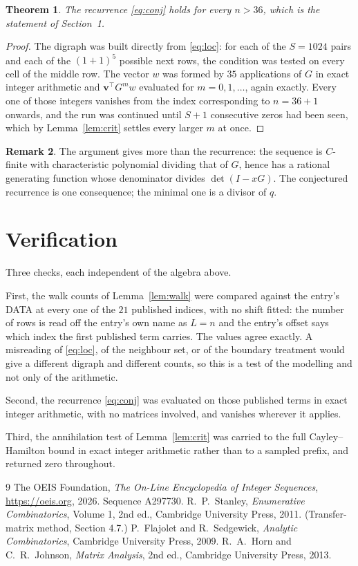 \documentclass[11pt,a4paper]{article}
\theoremstyle{plain}
\newtheorem{theorem}{Theorem}
\theoremstyle{definition}
\newtheorem{remark}[theorem]{Remark}
\begin{document}
\begin{theorem}
The recurrence \eqref{eq:conj} holds for every $n>36$, which is the statement of
Section~1.
\end{theorem}

\begin{proof}
The digraph was built directly from \eqref{eq:loc}: for each of the $S=1024$ pairs and each
of the $(1+1)^{5}$ possible next rows, the condition was tested on every cell of
the middle row. The vector $w$ was formed by $35$ applications of $G$ in exact integer
arithmetic and $\mathbf{v}^{\!\top}G^{m}w$ evaluated for $m=0,1,\dots$, again exactly.
Every one of those integers vanishes from the index corresponding to $n=36+1$ onwards,
and the run was continued until $S+1$ consecutive zeros had been seen, which by
Lemma~\ref{lem:crit} settles every larger $m$ at once.
\end{proof}

\begin{remark}
The argument gives more than the recurrence: the sequence is $C$-finite with characteristic
polynomial dividing that of $G$, hence has a rational generating function whose denominator
divides $\det(I-xG)$. The conjectured recurrence is one consequence; the minimal one is a
divisor of $q$.
\end{remark}

\section{Verification}

Three checks, each independent of the algebra above.

First, the walk counts of Lemma~\ref{lem:walk} were compared against the entry's DATA at
every one of the $21$ published indices, with no shift fitted: the number of rows is
read off the entry's own name as $L=n$ and the entry's offset says which index the first
published term carries. The values agree exactly. A misreading of \eqref{eq:loc}, of the
neighbour set, or of the boundary treatment would give a different digraph and different
counts, so this is a test of the modelling and not only of the arithmetic.

Second, the recurrence \eqref{eq:conj} was evaluated on those published terms in exact
integer arithmetic, with no matrices involved, and vanishes wherever it applies.

Third, the annihilation test of Lemma~\ref{lem:crit} was carried to the full
Cayley--Hamilton bound in exact integer arithmetic rather than to a sampled prefix, and
returned zero throughout.

\begin{thebibliography}{9}
 The OEIS Foundation, \emph{The On-Line Encyclopedia of Integer
Sequences}, \url{https://oeis.org}, 2026. Sequence A297730.
 R.~P.~Stanley, \emph{Enumerative Combinatorics}, Volume 1, 2nd ed.,
Cambridge University Press, 2011. (Transfer-matrix method, Section 4.7.)
 P.~Flajolet and R.~Sedgewick, \emph{Analytic Combinatorics}, Cambridge
University Press, 2009.
 R.~A.~Horn and C.~R.~Johnson, \emph{Matrix Analysis}, 2nd ed., Cambridge
University Press, 2013.
\end{thebibliography}
\end{document}
